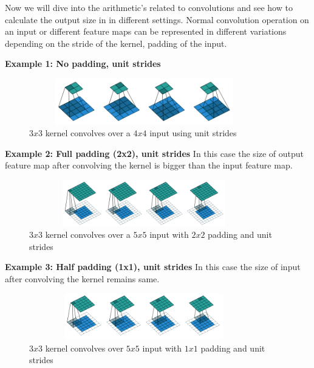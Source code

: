     Now we will dive into the arithmetic's related to convolutions and see how to calculate the output size in
    in different settings. Normal convolution operation on an input or different feature maps can be represented in different variations depending on the stride of the kernel, padding of the input. 
    
    \textbf{Example 1: No padding, unit strides}   
    
      \begin{figure}[h]
    \centering
    \includegraphics[width=10cm, height =2cm]{images/cnn_case1.png}
    \caption{$3x3$ kernel convolves over a $4x4$ input using unit strides \cite{https://doi.org/10.48550/arxiv.1603.07285}}
    \end{figure}
    
    \textbf{Example 2: Full padding (2x2), unit strides} 
    In this case the size of output feature map after convolving the kernel is bigger than the input feature map.
      \begin{figure}[h]
    \centering
    \includegraphics[width=10cm, height =2cm]{images/cnn_case4.png}
    \caption{$3x3$ kernel convolves over a $5x5$ input with $2x2$ padding and unit strides \cite{https://doi.org/10.48550/arxiv.1603.07285}}
    \end{figure}
    
    \textbf{Example 3: Half padding (1x1), unit strides}
    In this case the size of input after convolving the kernel remains same. 
      \begin{figure}[h]
    \centering
    \includegraphics[width=10cm, height =2cm]{images/cnn_case3.png}
    \caption{$3x3$ kernel convolves \cite{https://doi.org/10.48550/arxiv.1603.07285} over $5x5$ input with $1x1$ padding and unit strides }
    \end{figure}
    
